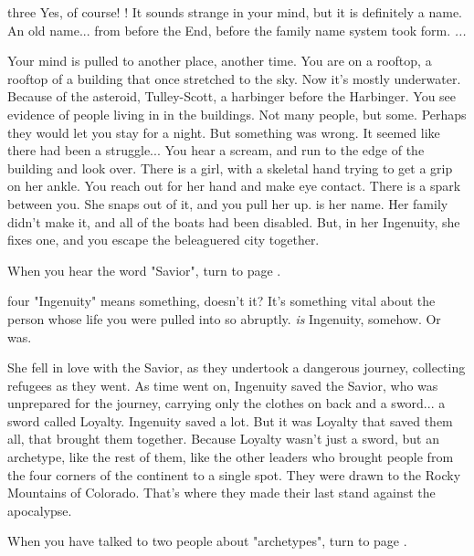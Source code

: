 \documentclass[greennotebook]{Silversiders} %
\begin{document}
\begin{page}{three}
Yes, of course! \cSavior{\intro}! It sounds strange in your mind, but it is definitely a name. An old name... from before the End, before the family name system took form. \emph{\cSavior{}...}

Your mind is pulled to another place, another time. You are on a rooftop, a rooftop of a building that once stretched to the sky. Now it's mostly underwater. Because of the asteroid, Tulley-Scott, a harbinger before the Harbinger. You see evidence of people living in in the buildings. Not many people, but some. Perhaps they would let you stay for a night. But something was wrong. It seemed like there had been a struggle... You hear a scream, and run to the edge of the building and look over. There is a girl, with a skeletal hand trying to get a grip on her ankle. You reach out for her hand and make eye contact. There is a spark between you. She snaps out of it, and you pull her up. \cIngenuityOld{} is her name. Her family didn't make it, and all of the boats had been disabled. But, in her Ingenuity, she fixes one, and you escape the beleaguered city together.

When you hear the word "Savior", turn to page .
\end{page}

\begin{page}{four}
"Ingenuity" means something, doesn't it? It's something vital about the person whose life you were pulled into so abruptly. \cIngenuityOld{} \emph{is} Ingenuity, somehow. Or was.

She fell in love with the Savior, as they undertook a dangerous journey, collecting refugees as they went. As time went on, Ingenuity saved the Savior, who was unprepared for the journey, carrying only the clothes on \cSavior{\their} back and a sword... a sword called Loyalty. Ingenuity saved \cSavior{\them} a lot. But it was Loyalty that saved them all, that brought them together. Because Loyalty wasn't just a sword, but an archetype, like the rest of them, like the other leaders who brought people from the four corners of the continent to a single spot. They were drawn to the Rocky Mountains of Colorado. That's where they made their last stand against the apocalypse.

When you have talked to two people about "archetypes", turn to page .
\end{page}
\end{document}

